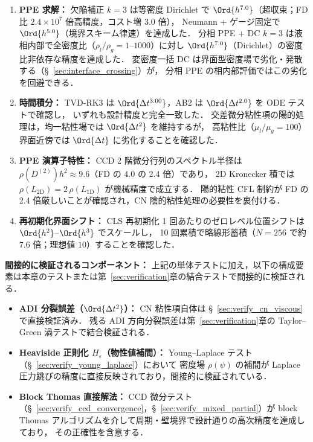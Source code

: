 \begin{enumerate}
        ただし風上差分経路は廃止済み（§~\ref{sec:verify_interface}）のため比較対象から除外し，
        2D 最高解像度は丸め・補間誤差床の影響を受ける．
  \item \textbf{PPE 求解：}
        欠陥補正 $k{=}3$ は等密度 Dirichlet で $\Ord{h^{7.0}}$（超収束；FD 比 $2.4 \times 10^7$ 倍高精度，コスト増 3.0 倍），
        Neumann + ゲージ固定で $\Ord{h^{5.0}}$（境界スキーム律速）を達成した．
        分相 PPE + DC $k{=}3$ は液相内部で全密度比（$\rho_l/\rho_g = 1$--$1000$）に対し
        $\Ord{h^{7.0}}$（Dirichlet）の密度比非依存な精度を達成した．
        変密度一括 DC は界面型密度場で劣化・発散する（§~\ref{sec:interface_crossing}）が，
        分相 PPE の相内部評価ではこの劣化を回避できる．
  \item \textbf{時間積分：}
        TVD-RK3 は $\Ord{\Delta t^{3.00}}$，AB2 は $\Ord{\Delta t^{2.0}}$ を ODE テストで確認し，
        いずれも設計精度と完全一致した．
        交差微分粘性項の陽的処理は，均一粘性場では $\Ord{\Delta t^2}$ を維持するが，
        高粘性比（$\mu_l/\mu_g = 100$）界面近傍では $\Ord{\Delta t}$ に劣化することを確認した．
  \item \textbf{PPE 演算子特性：}
        CCD 2 階微分行列のスペクトル半径は $\rho(D^{(2)}) h^2 \approx 9.6$（FD の $4.0$ の 2.4 倍）であり，
        2D Kronecker 積では $\rho(L_{\mathrm{2D}}) = 2\,\rho(L_{\mathrm{1D}})$ が機械精度で成立する．
        陽的粘性 CFL 制約が FD の 2.4 倍厳しいことが確認され，CN 陰的粘性処理の必要性を裏付ける．
  \item \textbf{再初期化界面シフト：}
        CLS 再初期化 1 回あたりのゼロレベル位置シフトは $\Ord{h^2}$--$\Ord{h^3}$ でスケールし，
        10 回累積で略線形蓄積（$N{=}256$ で約 $7.6$ 倍；理想値 $10$）することを確認した．
\end{enumerate}

\noindent\textbf{間接的に検証されるコンポーネント：}
上記の単体テストに加え，以下の構成要素は本章のテストまたは第~\ref{sec:verification}章の結合テストで間接的に検証される．
\begin{itemize}[noitemsep]
  \item \textbf{ADI 分裂誤差（$\Ord{\Delta t^2}$）：}
        CN 粘性項自体は §~\ref{sec:verify_cn_viscous} で直接検証済み．
        残る ADI 方向分裂誤差は第~\ref{sec:verification}章の Taylor--Green 渦テストで結合検証される．
  \item \textbf{Heaviside 正則化 $H_\varepsilon$（物性値補間）：}
        Young--Laplace テスト（§~\ref{sec:verify_young_laplace}）において
        密度場 $\rho(\psi)$ の補間が Laplace 圧力跳びの精度に直接反映されており，間接的に検証されている．
  \item \textbf{Block Thomas 直接解法：}
        CCD 微分テスト（§~\ref{sec:verify_ccd_convergence}，§~\ref{sec:verify_mixed_partial}）が
        block Thomas アルゴリズムを介して周期・壁境界で設計通りの高次精度を達成しており，
        その正確性を含意する．
\end{itemize}

